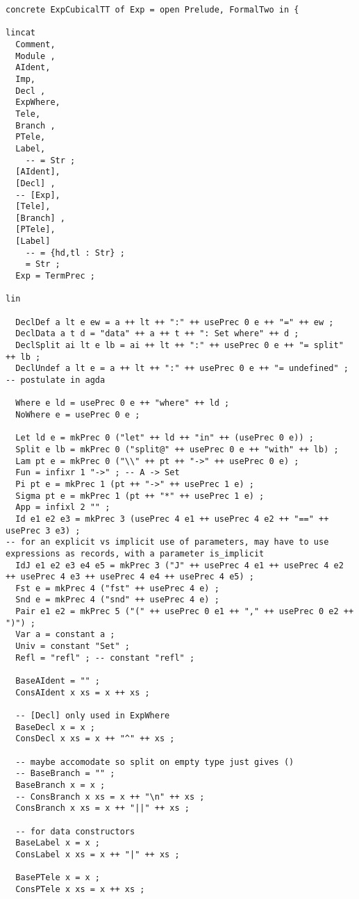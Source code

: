 \begin{verbatim}
concrete ExpCubicalTT of Exp = open Prelude, FormalTwo in {

lincat 
  Comment,
  Module ,
  AIdent,
  Imp,
  Decl ,
  ExpWhere,
  Tele,
  Branch ,
  PTele,
  Label,
    -- = Str ;
  [AIdent],
  [Decl] ,
  -- [Exp],
  [Tele],
  [Branch] ,
  [PTele],
  [Label]
    -- = {hd,tl : Str} ;
    = Str ;
  Exp = TermPrec ;

lin

  DeclDef a lt e ew = a ++ lt ++ ":" ++ usePrec 0 e ++ "=" ++ ew ;
  DeclData a t d = "data" ++ a ++ t ++ ": Set where" ++ d ;
  DeclSplit ai lt e lb = ai ++ lt ++ ":" ++ usePrec 0 e ++ "= split" ++ lb ;
  DeclUndef a lt e = a ++ lt ++ ":" ++ usePrec 0 e ++ "= undefined" ; -- postulate in agda

  Where e ld = usePrec 0 e ++ "where" ++ ld ;
  NoWhere e = usePrec 0 e ;

  Let ld e = mkPrec 0 ("let" ++ ld ++ "in" ++ (usePrec 0 e)) ;
  Split e lb = mkPrec 0 ("split@" ++ usePrec 0 e ++ "with" ++ lb) ;
  Lam pt e = mkPrec 0 ("\\" ++ pt ++ "->" ++ usePrec 0 e) ;
  Fun = infixr 1 "->" ; -- A -> Set
  Pi pt e = mkPrec 1 (pt ++ "->" ++ usePrec 1 e) ;
  Sigma pt e = mkPrec 1 (pt ++ "*" ++ usePrec 1 e) ;
  App = infixl 2 "" ;
  Id e1 e2 e3 = mkPrec 3 (usePrec 4 e1 ++ usePrec 4 e2 ++ "==" ++ usePrec 3 e3) ;
-- for an explicit vs implicit use of parameters, may have to use expressions as records, with a parameter is_implicit
  IdJ e1 e2 e3 e4 e5 = mkPrec 3 ("J" ++ usePrec 4 e1 ++ usePrec 4 e2 ++ usePrec 4 e3 ++ usePrec 4 e4 ++ usePrec 4 e5) ;
  Fst e = mkPrec 4 ("fst" ++ usePrec 4 e) ;
  Snd e = mkPrec 4 ("snd" ++ usePrec 4 e) ;
  Pair e1 e2 = mkPrec 5 ("(" ++ usePrec 0 e1 ++ "," ++ usePrec 0 e2 ++ ")") ;
  Var a = constant a ;
  Univ = constant "Set" ;
  Refl = "refl" ; -- constant "refl" ;

  BaseAIdent = "" ;
  ConsAIdent x xs = x ++ xs ;

  -- [Decl] only used in ExpWhere
  BaseDecl x = x ;
  ConsDecl x xs = x ++ "^" ++ xs ;

  -- maybe accomodate so split on empty type just gives () 
  -- BaseBranch = "" ;
  BaseBranch x = x ;
  -- ConsBranch x xs = x ++ "\n" ++ xs ;
  ConsBranch x xs = x ++ "||" ++ xs ;

  -- for data constructors
  BaseLabel x = x ;
  ConsLabel x xs = x ++ "|" ++ xs ; 

  BasePTele x = x ;
  ConsPTele x xs = x ++ xs ;


\end{verbatim}
